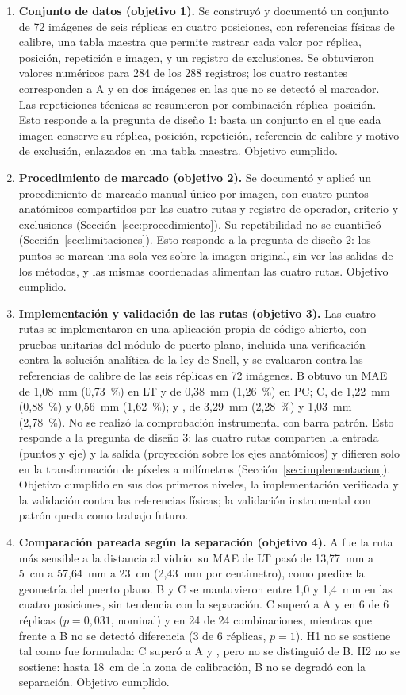 \begin{enumerate}
  \item \textbf{Conjunto de datos (objetivo 1).} Se construyó y documentó un conjunto de 72 imágenes de seis réplicas en cuatro posiciones, con referencias físicas de calibre, una tabla maestra que permite rastrear cada valor por réplica, posición, repetición e imagen, y un registro de exclusiones. Se obtuvieron valores numéricos para 284 de los 288 registros; los cuatro restantes corresponden a A y \Aprime{} en dos imágenes en las que no se detectó el marcador. Las repeticiones técnicas se resumieron por combinación réplica--posición. Esto responde a la pregunta de diseño 1: basta un conjunto en el que cada imagen conserve su réplica, posición, repetición, referencia de calibre y motivo de exclusión, enlazados en una tabla maestra. Objetivo cumplido.
  \item \textbf{Procedimiento de marcado (objetivo 2).} Se documentó y aplicó un procedimiento de marcado manual único por imagen, con cuatro puntos anatómicos compartidos por las cuatro rutas y registro de operador, criterio y exclusiones (Sección~\ref{sec:procedimiento}). Su repetibilidad no se cuantificó (Sección~\ref{sec:limitaciones}). Esto responde a la pregunta de diseño 2: los puntos se marcan una sola vez sobre la imagen original, sin ver las salidas de los métodos, y las mismas coordenadas alimentan las cuatro rutas. Objetivo cumplido.
  \item \textbf{Implementación y validación de las rutas (objetivo 3).} Las cuatro rutas se implementaron en una aplicación propia de código abierto, con pruebas unitarias del módulo de puerto plano, incluida una verificación contra la solución analítica de la ley de Snell, y se evaluaron contra las referencias de calibre de las seis réplicas en 72 imágenes. B obtuvo un MAE de 1,08~mm (0,73~\%) en LT y de 0,38~mm (1,26~\%) en PC; C, de 1,22~mm (0,88~\%) y 0,56~mm (1,62~\%); y \Aprime, de 3,29~mm (2,28~\%) y 1,03~mm (2,78~\%). No se realizó la comprobación instrumental con barra patrón. Esto responde a la pregunta de diseño 3: las cuatro rutas comparten la entrada (puntos y eje) y la salida (proyección sobre los ejes anatómicos) y difieren solo en la transformación de píxeles a milímetros (Sección~\ref{sec:implementacion}). Objetivo cumplido en sus dos primeros niveles, la implementación verificada y la validación contra las referencias físicas; la validación instrumental con patrón queda como trabajo futuro.
  \item \textbf{Comparación pareada según la separación (objetivo 4).} A fue la ruta más sensible a la distancia al vidrio: su MAE de LT pasó de 13,77~mm a 5~cm a 57,64~mm a 23~cm (2,43~mm por centímetro), como predice la geometría del puerto plano. B y C se mantuvieron entre 1,0 y 1,4~mm en las cuatro posiciones, sin tendencia con la separación. C superó a A y \Aprime{} en 6 de 6 réplicas ($p = 0{,}031$, nominal) y en 24 de 24 combinaciones, mientras que frente a B no se detectó diferencia (3 de 6 réplicas, $p = 1$). H1 no se sostiene tal como fue formulada: C superó a A y \Aprime, pero no se distinguió de B. H2 no se sostiene: hasta 18~cm de la zona de calibración, B no se degradó con la separación. Objetivo cumplido.

\end{enumerate}

